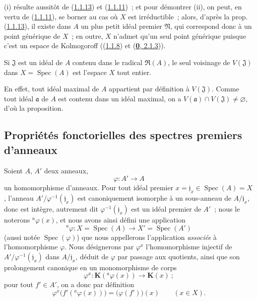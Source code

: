 (i) résulte aussitôt de (\hyperref[I.1.1.13-fr]{1.1.13}) et
(\hyperref[I.1.1.11-fr]{1.1.11})~; et pour démontrer (ii), on peut, en vertu de
(\hyperref[I.1.1.11-fr]{1.1.11}), se borner au cas où $X$ est irréductible~;
alors, d'après la prop. (\hyperref[I.1.1.13-fr]{1.1.13}), il existe dans $A$
un plus petit idéal premier $\mathfrak{N}$, qui correspond donc à un point
générique
de $X$~; en outre, $X$ n'admet qu'un seul point générique puisque c'est un
espace de Kolmogoroff ((\hyperref[I.1.1.8-fr]{1.1.8}) et
(\hyperref[0.2.1.3-fr]{\textbf{0}, 2.1.3})).

\begin{proposition}[1.1.15]
\label{I.1.1.15-fr}
Si $\mathfrak{J}$ est un idéal de $A$ contenu dans le radical
$\mathfrak{R}(A)$, le seul voisinage de $V(\mathfrak{J})$ dans
$X=\operatorname{Spec}(A)$ est l'espace $X$ tout entier.
\end{proposition}

En effet, tout idéal maximal de $A$ appartient par définition à
$V(\mathfrak{J})$. Comme tout idéal $\mathfrak{a}$ de $A$ est contenu dans un
idéal maximal, on a $V(\mathfrak{a})\cap V(\mathfrak{J})\neq\varnothing$,
d'où la proposition.

\subsection{Propriétés fonctorielles des spectres premiers d'anneaux}
\label{subsection:I.1.2-fr}

\begin{env}[1.2.1]
\label{I.1.2.1-fr}
Soient $A$, $A'$ deux anneaux,
\[
  \varphi:A'\longrightarrow A
\]
un homomorphisme d'anneaux. Pour tout idéal premier
$x=\mathfrak{j}_x\in\operatorname{Spec}(A)=X$, l'anneau
$A'/\varphi^{-1}(\mathfrak{j}_x)$ est canoniquement isomorphe à un
sous-anneau de $A/\mathfrak{j}_x$, donc est intègre, autrement dit
$\varphi^{-1}(\mathfrak{j}_x)$ est un idéal premier de $A'$~; nous le
noterons ${}^a\varphi(x)$, et nous avons ainsi défini une application
\[
  {}^a\varphi:X=\operatorname{Spec}(A)\longrightarrow
  X'=\operatorname{Spec}(A')
\]
(aussi notée $\operatorname{Spec}(\varphi)$) que nous appellerons
l'application \emph{associée} à l'homomorphisme $\varphi$. Nous désignerons par
$\varphi^x$ l'homomorphisme injectif de
$A'/\varphi^{-1}(\mathfrak{j}_x)$ dans $A/\mathfrak{j}_x$, déduit de
$\varphi$ par passage aux quotients, ainsi que son prolongement canonique en
un monomorphisme de corps
\[
  \varphi^x:\boldsymbol{K}({}^a\varphi(x))\longrightarrow\boldsymbol{K}(x)~;
\]
pour tout $f'\in A'$, on a donc par définition
\begin{equation}
  \varphi^x\bigl(f'({}^a\varphi(x))\bigr)=\bigl(\varphi(f')\bigr)(x)
  \qquad(x\in X).
  \tag{1.2.1.1}\label{I.1.2.1.1-fr}
\end{equation}
\end{env}

